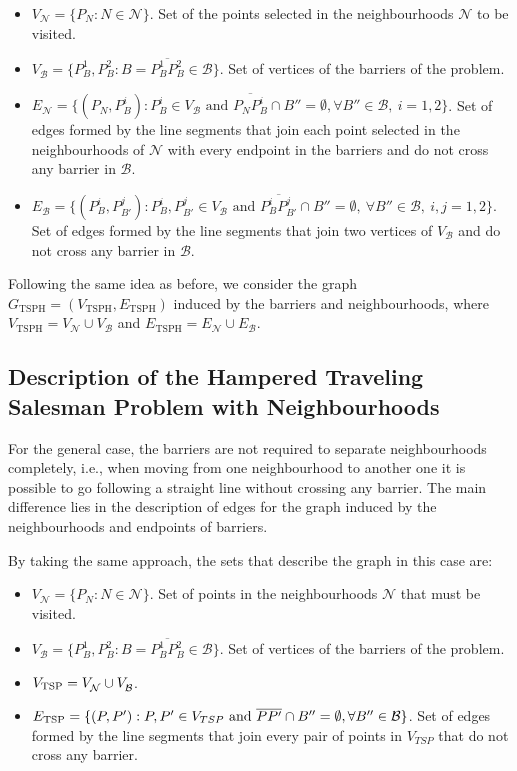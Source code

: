 \documentclass[a4paper,  review, authoryear, 1p.]{elsarticle}
\newcommand{\TSPN}{{\sf{H-TSPN}\xspace }}
\newcommand{\B}{{\mathcal B}}
\newcommand{\VB}{{V^{}_{\mathcal B}}}
\newcommand{\EB}{{E^{}_{\mathcal B}}}
\newcommand{\VN}{{V^{}_{\mathcal N}}}
\newcommand{\EN}{{E^{}_{\mathcal N}}}
\newcommand{\GTSPH}{{G_{\text{TSPH}}}}
\newcommand{\VTSPH}{{V_{\text{TSPH}}}}
\newcommand{\ETSPH}{{E_{\text{TSPH}}}}
\newcommand{\CV}[1]{{\color{red}#1}}
\begin{document}
		\begin{itemize}
			\item $\VN=\{P_N:N\in\mathcal N\}$. Set of the points selected in the neighbourhoods $\mathcal N$ to be visited.
			\item $\VB=\{P^1_B, P^2_B:B=\overline{P^1_B P^2_B}\in \mathcal B\}$. Set of vertices of the barriers of the problem.
			\item $\EN=\{(P_N, P^i_{B}):P^i_B\in V_\B\text{ and } \overline{P_NP^i_B}\cap B''=\emptyset,\forall B''\in\B,\:i=1,2\}$. Set of edges formed by the line segments that join each point selected in the neighbourhoods of $\mathcal N$ with every endpoint in the barriers and do not cross any barrier in $\B$.
			\item $\EB=\{(P^{i}_B, P^{j}_{B'}):P^i_B, P^j_{B'}\in \VB \text{ and } \overline{P^i_B P^j_{B'}}\cap B''=\emptyset,\:\forall B''\in\mathcal B,\:i, j=1,2\}$. Set of edges formed by the line segments that join two vertices of $V_{\mathcal B}$ and do not cross any barrier in $\B$.
		\end{itemize} 
		
		Following the same idea as before, we consider the graph $\GTSPH=(\VTSPH,\ETSPH)$ induced by the barriers and neighbourhoods, where $\VTSPH=\VN\cup\VB$ and $\ETSPH=\EN\cup\EB$.
		
		
		\CV{
		\subsection{Description of the Hampered Traveling Salesman Problem with Neighbourhoods}
		For the general case, the barriers are not required to separate neighbourhoods completely, i.e., when moving from one neighbourhood to another one it is possible to go following a straight line without crossing any barrier. The main difference lies in the description of edges for the graph induced by the neighbourhoods and endpoints of barriers.}

		By taking the same approach, the sets that describe the graph in this case are:
		
		\begin{itemize}
			\item $\VN=\{P_N:N\in\mathcal N\}$. Set of points in the neighbourhoods $\mathcal N$ that must be visited.
			\item $\VB=\{P^1_B, P^2_B:B=\overline{P^1_B P^2_B}\in \mathcal B\}$. Set of vertices of the barriers of the problem.
			\item $V_{\rm TSP} = \VN \cup \VB$.
			\item $E_{\rm TSP}=\{(P, P'):P, P' \in V_{TSP} \text{ and } \overline{PP'}\cap B''=\emptyset,\forall B''\in\B\}$. Set of edges formed by the line segments that join every pair of points in $V_{TSP}$ that do not cross any barrier.
		\end{itemize} 
		
\end{document}
